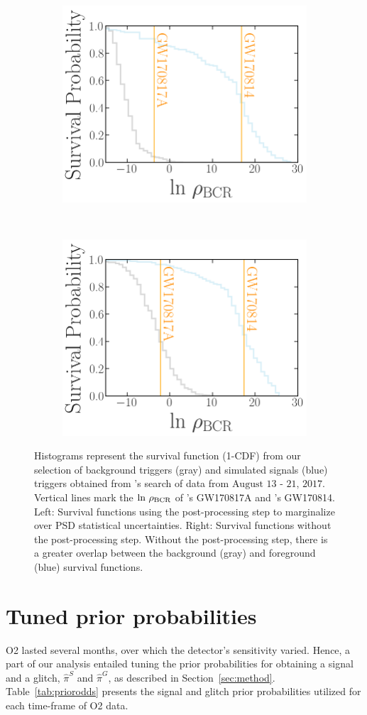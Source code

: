\documentclass[useAMS,fleqn, usenatbib, final]{mnras}
\begin{document}
\begin{figure}
    \centering
    \begin{subfigure}
        \centering
        \includegraphics[width=0.45\linewidth]{reweighted_bcr_cdf_smaller_legend.png}
    \end{subfigure}
    ~ 
    \begin{subfigure}
        \centering
        \includegraphics[width=0.45\linewidth]{orig_bcr_cdf_smaller_legend.png}
    \end{subfigure}
    \caption{
    Histograms represent the survival function (1-CDF) from our selection of background triggers (gray) and simulated signals (blue) triggers obtained from \pycbc's search of data from $\text{August 13 - 21, 2017}$. Vertical lines mark the $\text{ln}\ \bcr$ of \IAS's GW170817A and \GWTC's GW170814.
    Left: Survival functions using the post-processing step to marginalize over PSD statistical uncertainties. Right: Survival functions without the post-processing step. Without the post-processing step, there is a greater overlap between the background (gray) and foreground (blue) survival functions.
    \label{fig:bcrCdf}}
\end{figure}



\section{Tuned prior probabilities}\label{apdx:alphabeta}

O2 lasted several months, over which the detector's sensitivity varied. Hence, a part of our analysis entailed tuning the prior probabilities for obtaining a signal and a glitch, $\hat{\pi}^S$ and $\hat{\pi}^G$, as described in Section~\ref{sec:method}. Table~\ref{tab:priorodds} presents the signal and glitch prior probabilities utilized for each time-frame of O2 data. 

\end{document}
